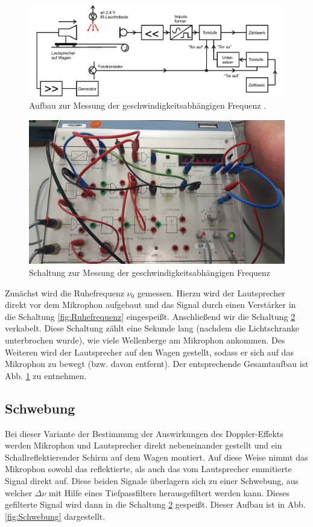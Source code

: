 \begin{figure}
  \centering
  \includegraphics[width = \textwidth]{./Abbildungen/Unbenann.PNG}
  \caption{Aufbau zur Messung der geschwindigkeitsabhängigen Frequenz \cite{Anleitung}.}
  \label{fig:vf}
\end{figure}

\begin{figure}
  \centering
  \includegraphics[width = \textwidth]{./Abbildungen/Frequenzmessung-Schranken.jpg}
  \caption{Schaltung zur Messung der geschwindigkeitsabhängigen Frequenz}
  \label{fig:vf-Schaltung}
\end{figure}

Zunächst wird die Ruhefrequenz $\nu_0$ gemessen. Hierzu wird der Lautsprecher
direkt vor dem Mikrophon aufgebaut und das Signal durch einen Verstärker in die
Schaltung \ref{fig:Ruhefrequenz} eingespeißt. Anschließend wir die Schaltung
\ref{fig:vf-Schaltung} verkabelt. Diese Schaltung zählt eine Sekunde lang
(nachdem die Lichtschranke unterbrochen wurde), wie viele Wellenberge am
Mikrophon ankommen. Des Weiteren wird der Lautsprecher auf den Wagen gestellt,
sodass er sich auf das Mikrophon zu bewegt (bzw. davon entfernt).
Der entsprechende Gesamtaufbau ist Abb. \ref{fig:vf} zu entnehmen.

\subsection{Schwebung}
\label{sec:Schwebung}
Bei dieser Variante der Bestimmung der Auswirkungen des Doppler-Effekts werden
Mikrophon und Lautsprecher direkt nebeneinander gestellt und ein
Schallreflektierender Schirm auf dem Wagen montiert. Auf diese Weise nimmt das
Mikrophon sowohl das reflektierte, als auch das vom Lautsprecher emmitierte
Signal direkt auf. Diese beiden Signale überlagern sich zu einer Schwebung,
aus welcher $\Delta \nu$ mit Hilfe eines Tiefpassfilters herausgefiltert werden kann.
Dieses gefilterte Signal wird dann in die Schaltung \ref{fig:vf-Schaltung}
gespeißt. Dieser Aufbau ist in Abb. \ref{fig:Schwebung} dargestellt.

